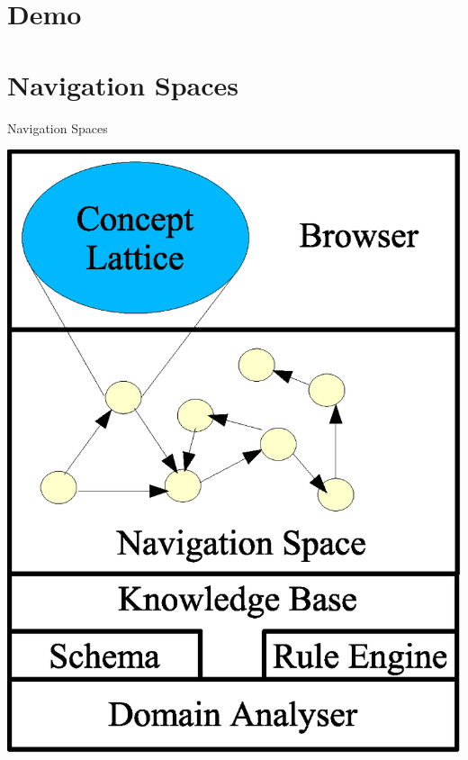 \documentclass[pdf,prettybox]{prosper}
\begin{document}
\part{Demo}



\part{Navigation Spaces}

\begin{slide}{Navigation Spaces}
 \begin{center}
  \includegraphics[height=0.8 \textheight]{img/system1.eps}
 \end{center}
\end{slide}
\end{document}
